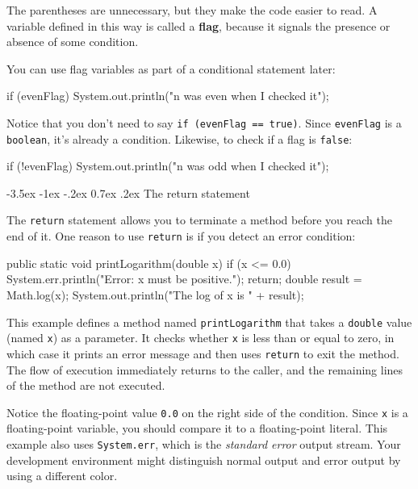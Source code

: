 \documentclass[12pt]{book}
\makeatletter
\theoremstyle{exercise}
\newcommand{\java}[1]{\verb"#1"}
\renewcommand{\section}{\@startsection{section}{1}{\z@}%
    {-3.5ex \@plus -1ex \@minus -.2ex}%
    {0.7ex \@plus.2ex}%
    {\normalfont\Large\bfseries}}
\newcommand{\java}[1]{\lstinline{#1}} %
\makeatother
\begin{document}
The parentheses are unnecessary, but they make the code easier to read.
A variable defined in this way is called a {\bf flag}, because it signals the presence or absence of some condition.

You can use flag variables as part of a conditional statement later:

\begin{code}
    if (evenFlag) {
        System.out.println("n was even when I checked it");
    }
\end{code}

Notice that you don't need to say \java{if (evenFlag == true)}.
Since \java{evenFlag} is a \java{boolean}, it's already a condition.
Likewise, to check if a flag is \java{false}:

\begin{code}
    if (!evenFlag) {
        System.out.println("n was odd when I checked it");
    }
\end{code}


\section{The return statement}


The \java{return} statement allows you to terminate a method before you reach the end of it.
One reason to use \java{return} is if you detect an error condition:

\begin{code}
    public static void printLogarithm(double x) {
        if (x <= 0.0) {
            System.err.println("Error: x must be positive.");
            return;
        }
        double result = Math.log(x);
        System.out.println("The log of x is " + result);
    }
\end{code}

This example defines a method named \java{printLogarithm} that takes a \java{double} value (named \java{x}) as a parameter.
It checks whether \java{x} is less than or equal to zero, in which case it prints an error message and then uses \java{return} to exit the method.
The flow of execution immediately returns to the caller, and the remaining lines of the method are not executed.


Notice the floating-point value \java{0.0} on the right side of the condition.
Since \java{x} is a floating-point variable, you should compare it to a floating-point literal.
This example also uses \java{System.err}, which is the {\it standard error} output stream.
Your development environment might distinguish normal output and error output by using a different color.
\end{document}
